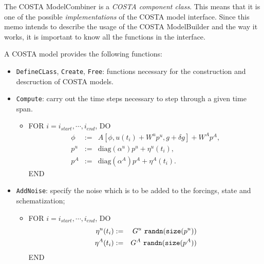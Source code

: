 \documentclass[a4paper,12pt]{article}
\begin{document}
The COSTA ModelCombiner is a {\em COSTA component class}. 
This means that it is one of the possible {\em implementations} of the
COSTA model interface. Since this memo intends to describe the usage of 
the COSTA ModelBuilder and the way it works, it is important to know
all the functions in the interface.

A COSTA model provides the following functions:
\begin{itemize}
 \item {\tt DefineCLass}, {\tt Create}, {\tt Free}: 
                      functions necessary for the construction and
                      descruction of COSTA models.
 \item {\tt Compute}: carry out the time steps necessary to step through a 
                      given time span.

 \begin{itemize}
   \item FOR $i=i_{start},\cdots,i_{end}$, DO
    \begin{eqnarray}
       \phi &:=& A[\phi,u(t_i)+W^u p^u,g+\delta g] + W^A p^A,
    \nonumber \\
      p^u &:= & \mbox{diag}(\alpha^u)p^u + \eta^u(t_i),
    \nonumber \\
      p^A &:= & \mbox{diag}(\alpha^A)p^A + \eta^A(t_i).
    \end{eqnarray}
    END
 \end{itemize}

 \item {\tt AddNoise}: specify the noise which is to be added to the
                      forcings, state and schematization;
 \begin{itemize}
   \item FOR $i=i_{start},\cdots,i_{end}$, DO
    \begin{eqnarray}
      \eta^u(t_i) &:= & G^u~ {\tt randn(size(}p^u{\tt ))}
    \nonumber \\
      \eta^A(t_i) &:= & G^A~ {\tt randn(size(}p^A{\tt ))}
    \end{eqnarray}
    END
 \end{itemize}


\end{itemize}
\end{document}

